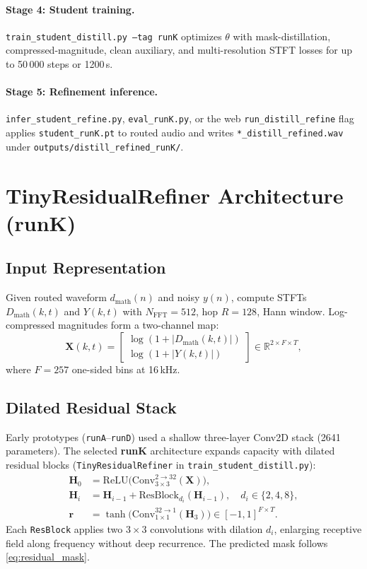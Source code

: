 \paragraph{Stage 4: Student training.}
\texttt{train\_student\_distill.py --tag runK} optimizes $\theta$ with mask-distillation, compressed-magnitude, clean auxiliary, and multi-resolution STFT losses for up to 50\,000 steps or 1200\,s.

\paragraph{Stage 5: Refinement inference.}
\texttt{infer\_student\_refine.py}, \texttt{eval\_runK.py}, or the web \texttt{run\_distill\_refine} flag applies \texttt{student\_runK.pt} to routed audio and writes \texttt{*\_distill\_refined.wav} under \texttt{outputs/distill\_refined\_runK/}.

\section{TinyResidualRefiner Architecture (runK)}
\label{sec:architecture_student}

\subsection{Input Representation}

Given routed waveform $d_{\mathrm{math}}(n)$ and noisy $y(n)$, compute STFTs $D_{\mathrm{math}}(k,t)$ and $Y(k,t)$ with $N_{\mathrm{FFT}}=512$, hop $R=128$, Hann window. Log-compressed magnitudes form a two-channel map:
\begin{equation}
  \mathbf{X}(k,t) =
  \begin{bmatrix}
    \log(1+|D_{\mathrm{math}}(k,t)|) \\
    \log(1+|Y(k,t)|)
  \end{bmatrix}
  \in \mathbb{R}^{2\times F\times T},
  \label{eq:student_input}
\end{equation}
where $F=257$ one-sided bins at 16\,kHz.

\subsection{Dilated Residual Stack}

Early prototypes (\texttt{runA}--\texttt{runD}) used a shallow three-layer Conv2D stack (2641 parameters). The selected \textbf{runK} architecture expands capacity with dilated residual blocks (\texttt{TinyResidualRefiner} in \texttt{train\_student\_distill.py}):
\begin{align}
  \mathbf{H}_0 &= \mathrm{ReLU}\bigl(\mathrm{Conv}_{3\times3}^{2\to 32}(\mathbf{X})\bigr), \\
  \mathbf{H}_i &= \mathbf{H}_{i-1} + \mathrm{ResBlock}_{d_i}(\mathbf{H}_{i-1}),\quad d_i \in \{2,4,8\}, \\
  \mathbf{r}   &= \tanh\bigl(\mathrm{Conv}_{1\times1}^{32\to 1}(\mathbf{H}_3)\bigr) \in [-1,1]^{F\times T}.
\end{align}
Each \texttt{ResBlock} applies two $3\times3$ convolutions with dilation $d_i$, enlarging receptive field along frequency without deep recurrence. The predicted mask follows \eqref{eq:residual_mask}.

